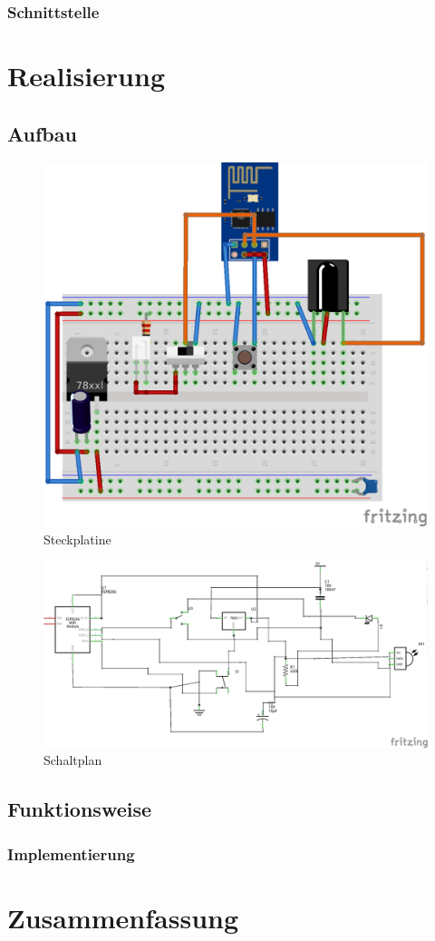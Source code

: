 \subsubsection{Schnittstelle}

\section{Realisierung}
\subsection{Aufbau}


\begin{figure}
	\centering
	\includegraphics[scale=1]{Abbildungen/ESP8266_Steckplatine}
	\caption{Steckplatine}
\end{figure}

\begin{figure}
	\centering
	\includegraphics[scale=1]{Abbildungen/ESP8266_Schaltplan}
	\caption{Schaltplan}
\end{figure}


\subsection{Funktionsweise}
\subsubsection{Implementierung}
\section{Zusammenfassung}

\pagestyle{empty}										%
